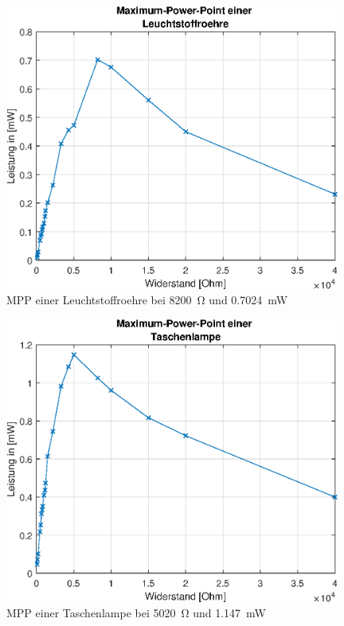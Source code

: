 \begin{figure}[htb]
\centering
\includegraphics[width=11cm]{pictures/MPP/Leuchtstoffroehre-MPP.eps}
\caption{MPP einer Leuchtstoffroehre bei \SI{8200}{\ohm} und \SI{0.7024}{\milli \watt}}
\label{fig:I_U_Leuchtstoffroehre}
\end{figure}

\clearpage
\begin{figure}[htb]
\centering
\includegraphics[width=11cm]{pictures/MPP/Taschenlampe-MPP.eps}
\caption{MPP einer Taschenlampe bei \SI{5020}{\ohm} und \SI{1.147}{\milli \watt}}
\label{fig:I_U_Taschenlampe}
\end{figure}

